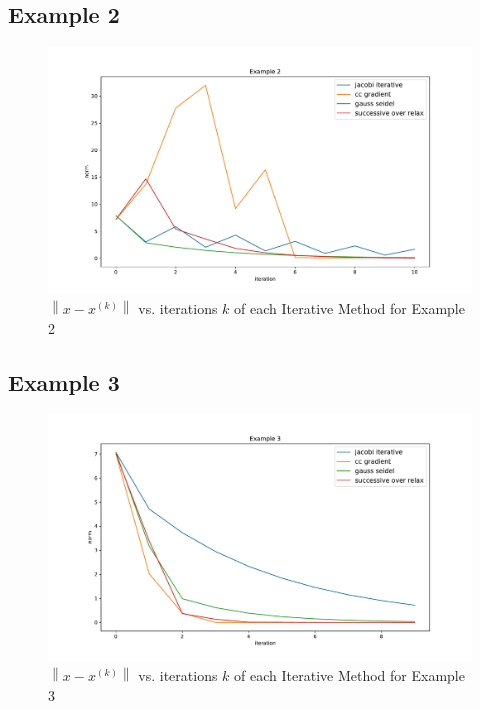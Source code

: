 \documentclass[11pt]{article}	%
\newcommand\norm[1]{\left\lVert#1\right\rVert}
\begin{document}
\subsection{Example 2}
\begin{figure}[H]
\centering
\includegraphics[width=.9\textwidth]{2}
\caption{$\norm{x - x^{(k)}}$ vs. iterations $k$ of each Iterative Method for Example 2}
\label{fig:2}
\end{figure}

\subsection{Example 3}
\begin{figure}[H]
\centering
\includegraphics[width=.9\textwidth]{3}
\caption{$\norm{x - x^{(k)}}$ vs. iterations $k$ of each Iterative Method for Example 3}
\label{fig:3}
\end{figure}
\end{document}

